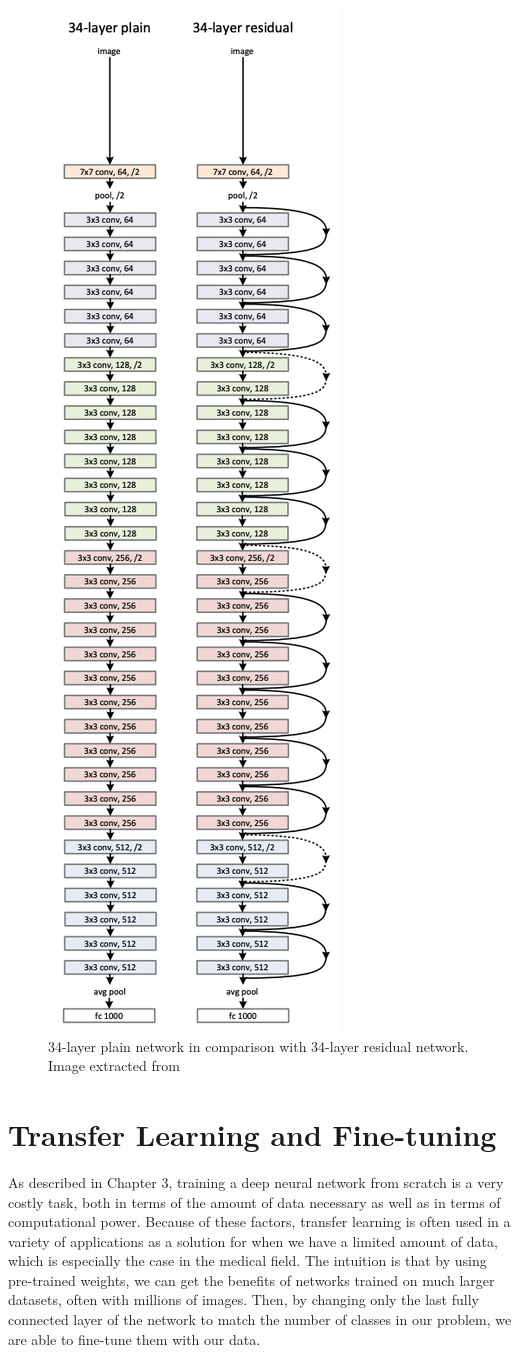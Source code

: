 \begin{figure}[h!tp]
    \centering
    \includegraphics[width=.4\textwidth]{imgs/chap5_resnet.png}
    \caption[34-layer plain network in comparison with 34-layer residual network.]{34-layer plain network in comparison with 34-layer residual network. Image extracted from \cite{ParkhiVZ15}}
    \label{fig:resnet}
\end{figure}

\section{Transfer Learning and Fine-tuning}

As described in Chapter 3, training a deep neural network from scratch is a very costly task, both in terms of the amount of data necessary as well as in terms of computational power. Because of these factors, transfer learning is often used in a variety of applications as a solution for when we have a limited amount of data, which is especially the case in the medical field. The intuition is that by using pre-trained weights, we can get the benefits of networks trained on much larger datasets, often with millions of images. Then, by changing only the last fully connected layer of the network to match the number of classes in our problem, we are able to fine-tune them with our data.

